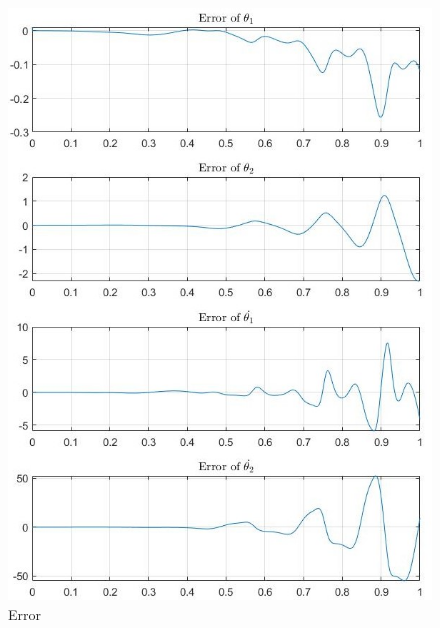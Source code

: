 \documentclass{beamer}
\begin{document}
\begin{frame}
\begin{figure}
\begin{multicols*}{2}
                \columnbreak
                \includegraphics[scale=.25]{./Figs/error.jpg}
                \caption{Error}
            \end{multicols*}
        \end{figure}

    \end{frame}
\end{document}
